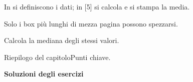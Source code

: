 In  si definiscono i dati; in [5] si calcola e si stampa la media.
\begin{tecnica}Solo i box più lunghi di mezza pagina possono spezzarsi.\end{tecnica}
\begin{esercizi}
\begin{passi}\item Calcola la mediana degli stessi valori.\end{passi}
\end{esercizi}
\begin{appunti}{Riepilogo del capitolo}Punti chiave.\end{appunti}
\clearpage
{}
{\headfont\bfseries\Huge\color{navy}Soluzioni degli esercizi\par}
\vspace{4pt}{\color{teal}\rule{3cm}{2.5pt}}\vspace{8pt}

